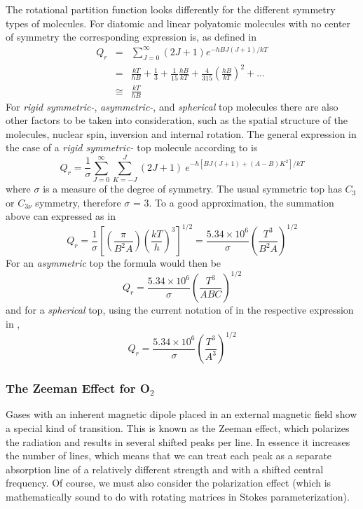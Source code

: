 The rotational partition function looks differently for the different
symmetry types of molecules.
For diatomic and linear  polyatomic molecules with no center of
symmetry the corresponding expression is, as defined in \citet{gordyandcook:70}
\begin{eqnarray}\label{eq:abs_theory:rot_partition}
Q_r & = & \sum_{J=0}^\infty (2J+1)e^{-hBJ(J+1)/kT}\nonumber\\
   & = & \frac{kT}{hB}+\frac{1}{3}+\frac{1}{15}\frac{hB}{kT}+\frac{4}{315}\left(\frac{hB}{kT}\right)^2+...\nonumber\\
   & \cong & \frac{kT}{hB}
\end{eqnarray}
For {\it{ rigid symmetric-}}, {\it{asymmetric-}}, and {\it{spherical}} top molecules there are also
other factors to be taken into consideration, such as the
spatial structure of the molecules, nuclear spin, inversion and
internal rotation. The general expression in the case of a 
{\it{ rigid symmetric-}} top molecule according to \citet{herzberg:45}
is
\begin{equation}\label{eq:abs_theory:rot_partition_symtop}
Q_r  =  \frac{1}{\sigma}\sum_{J=0}^\infty \sum_{K=-J}^{J}(2J+1)~e^{-h[BJ(J+1)+(A-B)K^2]/kT}
\end{equation}
where $\sigma$ is a measure of the degree of symmetry. The usual
symmetric top has $C_3$ or $C_{3\nu}$ symmetry, therefore $\sigma$ = 3. To a good
approximation, the summation above can expressed as in \citet{gordyandcook:70}
\begin{equation}\label{eq:abs_theory:rot_partition_top_appro}
Q_r  = 
\frac{1}{\sigma}\left[\left(\frac{\pi}{B^2A}\right)\left(\frac{kT}{h}\right)^3\right]^{1/2}=
\frac{5.34\times 10^6}{\sigma}\left(\frac{T^3}{B^{2}A}\right)^{1/2}
\end{equation}
For an  {\it{asymmetric}} top the formula would then be 
\begin{equation}\label{eq:abs_theory:rot_partition_asymtop}
Q_r = \frac{5.34\times 10^6}{\sigma}\left(\frac{T^3}{ABC}\right)^{1/2}
\end{equation}
and for a {\it{spherical}} top, using the current notation of
\citet{gordyandcook:70} in the respective expression in \citet{herzberg:45},
\begin{equation}\label{eq:abs_theory:rot_partition_sphetop}
Q_r = \frac{5.34\times 10^6}{\sigma}\left(\frac{T^3}{A^3}\right)^{1/2}
\end{equation}

\subsubsection{The Zeeman Effect for O$_2$}
Gases with an inherent magnetic dipole placed in an external magnetic field show a special kind of transition. This is known as the Zeeman effect, which polarizes the radiation and results in several shifted peaks per line. In essence it increases the number of lines, which means that we can treat each peak as a separate absorption line of a relatively different strength and with a shifted central frequency. Of course, we must also consider the polarization effect (which is mathematically sound to do with rotating matrices in Stokes parameterization).

